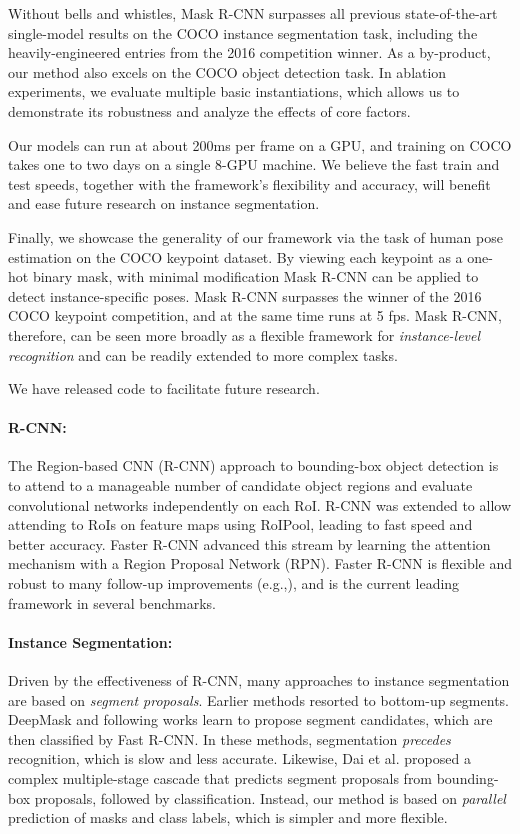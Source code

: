 Without bells and whistles, Mask R-CNN surpasses all previous state-of-the-art single-model results on the COCO instance segmentation task, including the heavily-engineered entries from the 2016 competition winner. As a by-product, our method also excels on the COCO object detection task. In ablation experiments, we evaluate multiple basic instantiations, which allows us to demonstrate its robustness and analyze the effects of core factors.

Our models can run at about 200ms per frame on a GPU, and training on COCO takes one to two days on a single 8-GPU machine. We believe the fast train and test speeds, together with the framework's flexibility and accuracy, will benefit and ease future research on instance segmentation.

Finally, we showcase the generality of our framework via the task of human pose estimation on the COCO keypoint dataset. By viewing each keypoint as a one-hot binary mask, with minimal modification Mask R-CNN can be applied to detect instance-specific poses. Mask R-CNN surpasses the winner of the 2016 COCO keypoint competition, and at the same time runs at 5 fps. Mask R-CNN, therefore, can be seen more broadly as a flexible framework for \emph{instance-level recognition} and can be readily extended to more complex tasks.

We have released code to facilitate future research.


\paragraph{R-CNN:} The Region-based CNN (R-CNN) approach to bounding-box object detection is to attend to a manageable number of candidate object regions and evaluate convolutional networks  independently on each RoI. R-CNN was extended to allow attending to RoIs on feature maps using RoIPool, leading to fast speed and better accuracy. Faster R-CNN advanced this stream by learning the attention mechanism with a Region Proposal Network (RPN). Faster R-CNN is flexible and robust to many follow-up improvements (e.g.,), and is the current leading framework in several benchmarks.

\paragraph{Instance Segmentation:} Driven by the effectiveness of R-CNN, many approaches to instance segmentation are based on \emph{segment proposals}. Earlier methods resorted to bottom-up segments. DeepMask and following works learn to propose segment candidates, which are then classified by Fast R-CNN. In these methods, segmentation \emph{precedes} recognition, which is slow and less accurate. Likewise, Dai et al. proposed a complex multiple-stage cascade that predicts segment proposals from bounding-box proposals, followed by classification. Instead, our method is based on \emph{parallel} prediction of masks and class labels, which is simpler and more flexible.


